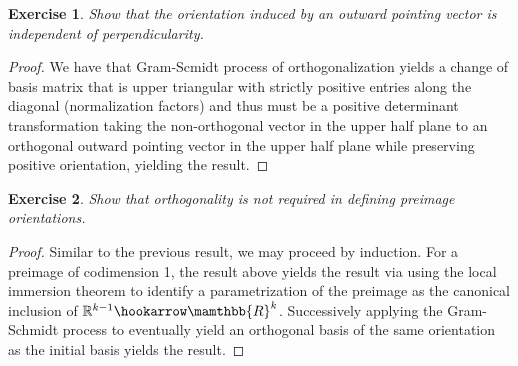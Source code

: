 \documentclass{article}
\newtheorem{exercise}{Exercise}
\begin{document}
\begin{exercise}
Show that the orientation induced by an outward pointing vector is independent of perpendicularity.   
\end{exercise}

\begin{proof}
We have that Gram-Scmidt process of orthogonalization yields a change of basis matrix that is upper triangular with strictly positive entries along the diagonal (normalization factors) and thus must be a positive determinant transformation taking the non-orthogonal vector in the upper half plane to an orthogonal outward pointing vector in the upper half plane while preserving positive orientation, yielding the result.   
\end{proof}

\begin{exercise}
Show that orthogonality is not required in defining preimage orientations.   
\end{exercise}

\begin{proof}
  Similar to the previous result, we may proceed by induction. For a preimage of codimension 1, the result above yields the result via using the local immersion theorem to identify a parametrization of the preimage as the canonical inclusion of $\mathbb{R}^{k-1} \hookarrow \mamthbb{R}^{k}$. Successively applying the Gram-Schmidt process to eventually yield an orthogonal basis of the same orientation as the initial basis yields the result. 
\end{proof}
\end{document}
